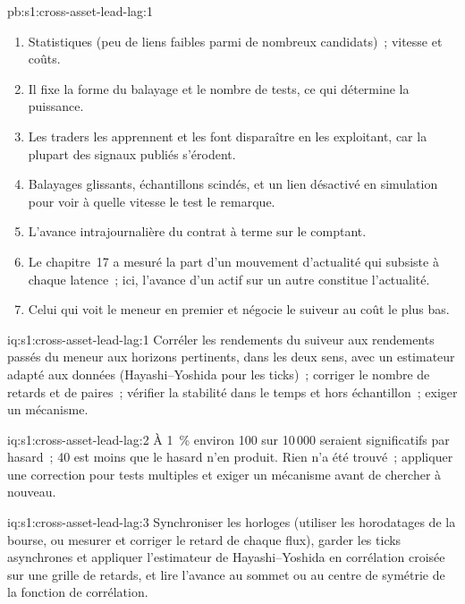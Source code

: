 \begin{solution}{pb:s1:cross-asset-lead-lag:1}
\begin{enumerate}
une seconde, et une perte à partir de deux secondes.
\item Statistiques (peu de liens faibles parmi de nombreux candidats)~; vitesse et coûts.
\item Il fixe la forme du balayage et le nombre de tests, ce qui détermine la puissance.
\item Les traders les apprennent et les font disparaître en les exploitant, car la plupart des signaux publiés s'érodent.
\item Balayages glissants, échantillons scindés, et un lien désactivé en simulation pour voir à quelle vitesse le test le remarque.
\item L'avance intrajournalière du contrat à terme sur le comptant.
\item Le chapitre~17 a mesuré la part d'un mouvement d'actualité qui subsiste à chaque latence~; ici, l'avance d'un actif sur un autre constitue l'actualité.
\item Celui qui voit le meneur en premier et négocie le suiveur au coût le plus bas.
\end{enumerate}
\end{solution}

\begin{solution}{iq:s1:cross-asset-lead-lag:1}
Corréler les rendements du suiveur aux rendements passés du meneur aux horizons pertinents, dans les deux sens, avec un estimateur adapté aux données
(Hayashi--Yoshida pour les ticks)~; corriger le nombre de retards et de paires~; vérifier la stabilité dans le temps et hors échantillon~; exiger un mécanisme.
\end{solution}

\begin{solution}{iq:s1:cross-asset-lead-lag:2}
À 1~\% environ 100 sur 10\,000 seraient significatifs par hasard~; 40 est moins que le hasard n'en produit. Rien n'a été trouvé~; appliquer une correction pour tests multiples et exiger
un mécanisme avant de chercher à nouveau.
\end{solution}

\begin{solution}{iq:s1:cross-asset-lead-lag:3}
Synchroniser les horloges (utiliser les horodatages de la bourse, ou mesurer et corriger le retard de chaque flux), garder les ticks asynchrones et appliquer l'estimateur de
Hayashi--Yoshida en corrélation croisée sur une grille de retards, et lire l'avance au sommet ou au centre de symétrie de la fonction de corrélation.
\end{solution}

